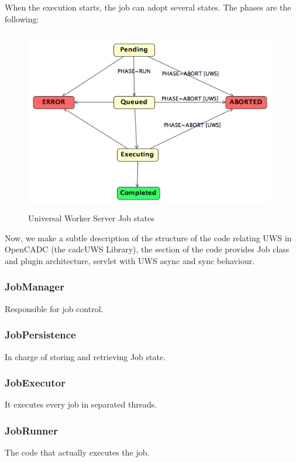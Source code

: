 When the execution starts, the job can adopt several states. The phases are the following:

\begin{figure}[tb]
\centering
\includegraphics[width=11cm,height=8cm]{images/UWSStates.png}
\caption{Universal Worker Server Job states}
\end{figure}

Now, we make a subtle description of the structure of the code relating UWS in OpenCADC (the cadcUWS Library), the section of the code provides Job class and plugin architecture, servlet with UWS async and sync behaviour.

\subsubsection{JobManager}

Responsible for job control.

\subsubsection{JobPersistence}

In charge of storing and retrieving Job state.

\subsubsection{JobExecutor}

It executes every job in separated threads.

\subsubsection{JobRunner}

The code that actually executes the job.


